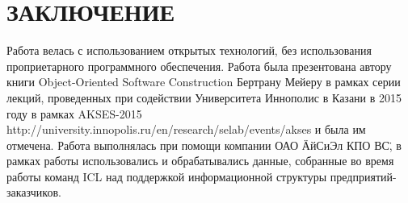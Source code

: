 \chapter*{ЗАКЛЮЧЕНИЕ}						%




Работа велась с использованием открытых технологий, без использования проприетарного программного обеспечения. Работа была презентована автору книги Object-Oriented Software Construction \cite{Meyer} Бертрану Мейеру в рамках серии лекций, проведенных при содействии Университета Иннополис в Казани в 2015 году в рамках AKSES-2015 http://university.innopolis.ru/en/research/selab/events/akses и была им отмечена.  
Работа выполнялась при помощи компании ОАО \"АйСиЭл КПО ВС\", в рамках работы использовались и обрабатывались данные, собранные во время работы команд ICL над поддержкой информационной структуры предприятий-заказчиков.
